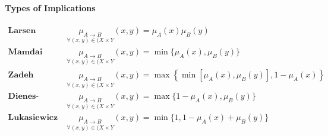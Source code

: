 \documentclass{tron}
\begin{document}
\paragraph{Types of Implications}
\begin{align}
	\textbf{Larsen implication:} \; & \underset{\forall (x,y) \in (X \times Y}{\mu_{A\rightarrow B}} (x,y) = \mu_A(x) \mu_B(y) \\
	\textbf{Mamdai implication:} \; & \underset{\forall (x,y) \in (X \times Y}{\mu_{A\rightarrow B}} (x,y) = \min\{ \mu_A(x), \mu_B(y) \} \\
	\textbf{Zadeh implication:} \; & \underset{\forall (x,y) \in (X \times Y}{\mu_{A\rightarrow B}} (x,y) = \max\left\{\min[ \mu_A(x), \mu_B(y) ], 1- \mu_A(x) \right\} \\
	\textbf{Dienes-Rascher implication:} \; & \underset{\forall (x,y) \in (X \times Y}{\mu_{A\rightarrow B}} (x,y) = \max\{ 1 - \mu_A(x), \mu_B(y) \} \\
	\textbf{Lukasiewicz implication:} \; & \underset{\forall (x,y) \in (X \times Y}{\mu_{A\rightarrow B}} (x,y) = \min\{ 1, 1 - \mu_A(x) + \mu_B(y) \}
\end{align}
\end{document}
